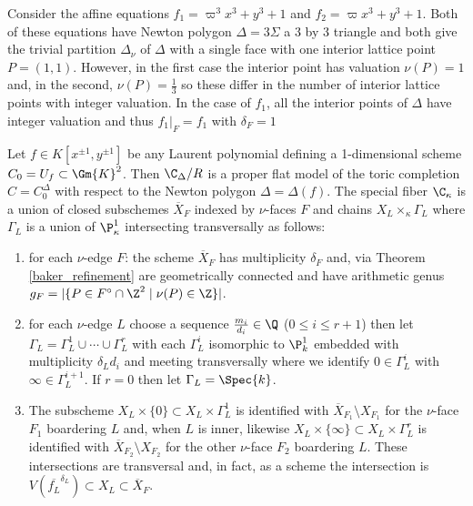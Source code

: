 \begin{example}
Consider the affine equations $f_1 = \varpi^3 x^3 + y^3 + 1$ and $f_2 = \varpi x^3 + y^3 + 1$. Both of these equations have Newton polygon $\Delta = 3 \Sigma$ a 3 by 3 triangle and both give the trivial partition $\Delta_\nu$ of $\Delta$ with a single face with one interior lattice point $P = (1,1)$. However, in the first case the interior point has valuation $\nu(P) = 1$ and, in the second, $\nu(P) = \tfrac{1}{3}$ so these differ in the number of interior lattice points with integer valuation. In the case of $f_1$, all the interior points of $\Delta$ have integer valuation and thus $f_1 |_F = f_1$ with $\delta_F = 1$ 
\end{example}



\begin{theorem}[DK, Thm. 3.14]
Let $f \in K[x^{\pm 1}, y^{\pm 1}]$ be any Laurent polynomial defining a 1-dimensional scheme $C_0 = U_f \subset \Gm{K}^2$. Then $\C_\Delta / R$ is a proper flat model of the toric completion $C = C_0^\Delta$ with respect to the Newton polygon $\Delta = \Delta(f)$. The special fiber $\C_\kappa$ is a union of closed subschemes $\overline{X}_F$ indexed by $\nu$-faces $F$ and chains $X_L \times_\kappa \Gamma_L$ where $\Gamma_L$ is a union of $\P^1_{\kappa}$ intersecting transversally as follows:
\begin{enumerate}
\item for each $\nu$-edge $F$: the scheme $\overline{X}_F$ has multiplicity $\delta_F$ and, via Theorem \ref{baker_refinement} are geometrically connected and have arithmetic genus $ g_F = |\{ P \in F^\circ \cap \Z^2 \mid \nu(P) \in \Z \} | $.
\item for each $\nu$-edge $L$ choose a sequence $\frac{m_i}{d_i} \in \Q$ ($0 \le i \le r+1$) then let $\Gamma_L = \Gamma^1_L \cup \cdots \cup \Gamma^r_L$ with each $\Gamma^i_L$ isomorphic to $\P^1_k$ embedded with multiplicity $\delta_L d_i$ and meeting transversally where we identify $0 \in \Gamma^i_L$ with $\infty \in \Gamma^{i+1}_L$. If $r = 0$ then let $\Gamma_L = \Spec{k}$.
\item The subscheme $X_L \times \{ 0 \} \subset X_L \times \Gamma^1_L$ is identified with $\overline{X}_{F_1} \setminus X_{F_1}$ for the $\nu$-face $F_1$ boardering $L$ and, when $L$ is inner, likewise $X_L \times \{ \infty \} \subset X_L \times \Gamma^r_L$ is identified with $\overline{X}_{F_2} \setminus X_{F_2}$ for the other $\nu$-face $F_2$ boardering $L$. These intersections are transversal and, in fact, as a scheme the intersection is $V(\overline{f_L}^{\delta_L}) \subset X_L \subset \overline{X}_F$. 

\end{enumerate}
\end{theorem}
